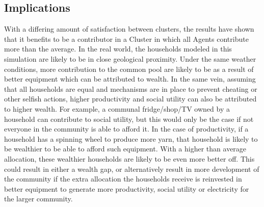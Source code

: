 \subsection*{Implications}
With a differing amount of satisfaction between clusters, the results have shown that it benefits to be a contributor in a Cluster in which all Agents contribute more than the average. In the real world, the households modeled in this simulation are likely to be in close geological proximity. Under the same weather conditions, more contribution to the common pool are likely to be as a result of better equipment which can be attributed to wealth. In the same vein, assuming that all households are equal and mechanisms are in place to prevent cheating or other selfish actions, higher productivity and social utility can also be attributed to higher wealth. For example, a communal fridge/shop/TV owned by a household can contribute to social utility, but this would only be the case if not everyone in the community is able to afford it. In the case of productivity, if a household has a spinning wheel to produce more yarn, that household is likely to be wealthier to be able to afford such equipment. 
With a higher than average allocation, these wealthier households are likely to be even more better off. This could result in either a wealth gap, or alternatively result in more development of the community if the extra allocation the households receive is reinvested in better equipment to generate more productivity, social utility or electricity for the larger community.
